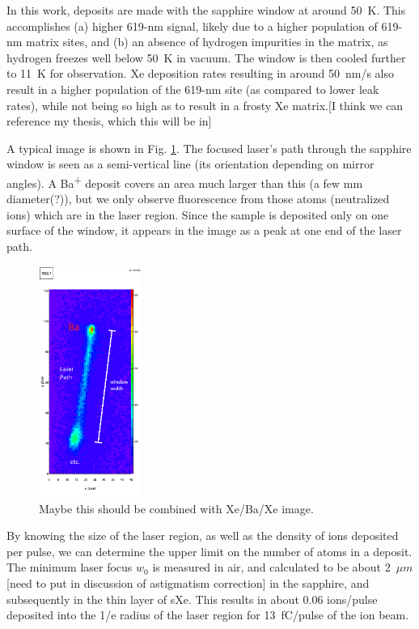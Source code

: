 \documentclass[aps,pra,reprint,superscriptaddress]{revtex4-1}
\begin{document}
In this work, deposits are made with the sapphire window at around 50~K. This accomplishes (a) higher 619-nm signal, likely due to a higher population of 619-nm matrix sites, and (b) an absence of hydrogen impurities in the matrix, as hydrogen freezes well below 50~K in vacuum.  The window is then cooled further to 11~K for observation.  Xe deposition rates resulting in around {\color{blue}50~nm/s} also result in a higher population of the 619-nm site (as compared to lower leak rates), while not being so high as to result in a frosty Xe matrix.{\color{red}[I think we can reference my thesis, which this will be in]}

A typical image is shown in Fig. \ref{fig:image_example}.  The focused laser's path through the sapphire window is seen as a semi-vertical line (its orientation depending on mirror angles).  A Ba\textsuperscript{+} deposit covers an area much larger than this (a few mm diameter(?)), but we only observe fluorescence from those atoms (neutralized ions) which are in the laser region.  Since the sample is deposited only on one surface of the window, it appears in the image as a peak at one end of the laser path.

\begin{figure}
\includegraphics[width=0.3\textwidth]{figures/2015-05-26_163_1.png}
\caption{{\color{red}Maybe this should be combined with Xe/Ba/Xe image.}}
\label{fig:image_example}
\end{figure}

By knowing the size of the laser region, as well as the density of ions deposited per pulse, we can determine the upper limit on the number of atoms in a deposit.  The minimum laser focus $w_0$ is measured in air, and calculated to be about {\color{red}2~$\mu m$ [need to put in discussion of astigmatism correction]} in the sapphire, and subsequently in the thin layer of sXe.  This results in about 0.06 ions/pulse deposited into the 1/e radius of the laser region for 13~fC/pulse of the ion beam.
\end{document}
